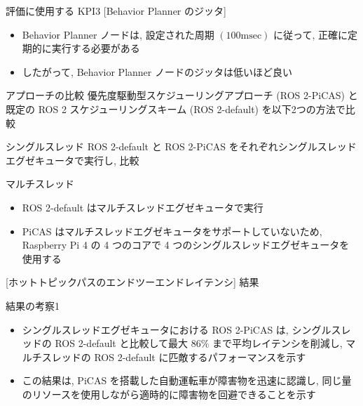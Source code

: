 \begin{frame}{評価に使用する KPI3 [Behavior Planner のジッタ]}
    \begin{itemize}
        \item Behavior Planner ノードは, 設定された周期 $(100 \mathrm{msec})$ に従って, 正確に定期的に実行する必要がある
        \item したがって, Behavior Planner ノードのジッタは低いほど良い
    \end{itemize}
\end{frame}

\begin{frame}{アプローチの比較}
    \vspace{-1mm}
    優先度駆動型スケジューリングアプローチ (ROS 2-PiCAS) と既定の ROS 2 スケジューリングスキーム (ROS 2-default) を以下2つの方法で比較
    \vspace{-1mm}
    \begin{block}{シングルスレッド}
        ROS 2-default と ROS 2-PiCAS をそれぞれシングルスレッドエグゼキュータで実行し, 比較
    \end{block}
    \begin{block}{マルチスレッド}
        \begin{itemize}
            \item ROS 2-default はマルチスレッドエグゼキュータで実行
            \item PiCAS はマルチスレッドエグゼキュータをサポートしていないため, Raspberry Pi 4 の 4 つのコアで 4 つのシングルスレッドエグゼキュータを使用する
        \end{itemize}
    \end{block}
\end{frame}

\begin{frame}{[ホットトピックパスのエンドツーエンドレイテンシ] 結果}
\end{frame}

\begin{frame}{結果の考察1}
    \begin{itemize}
        \item シングルスレッドエグゼキュータにおける ROS 2-PiCAS は, シングルスレッドの ROS 2-default と比較して最大 $86 \%$ まで平均レイテンシを削減し, マルチスレッドの ROS 2-default に匹敵するパフォーマンスを示す
        \item この結果は, PiCAS を搭載した自動運転車が障害物を迅速に認識し, 同じ量のリソースを使用しながら適時的に障害物を回避できることを示す
    \end{itemize}
\end{frame}

